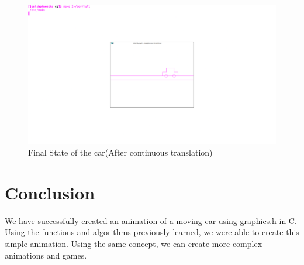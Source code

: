\documentclass[12pt]{article}
\begin{document}
	\begin{figure}[!h]
		\hspace*{-1cm}
		\centering
		\includegraphics[width=1.01\linewidth]{output2.png}
		\caption{Final State of the car(After continuous translation)}
		\label{fig:}
	\end{figure}

	\section{Conclusion}
	We have successfully created an animation of a moving car using graphics.h in C.
	Using the functions and algorithms previously learned, we were able to create this simple animation.
	Using the same concept, we can create more complex animations and games.
\end{document}
